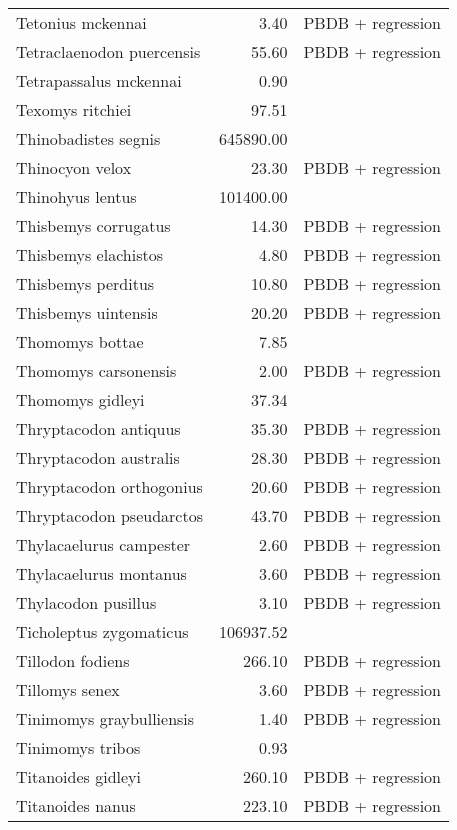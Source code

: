 \begin{table}[ht]
\begin{tabular}{lrl}
  Tetonius mckennai & 3.40 & PBDB + regression \\ 
  Tetraclaenodon puercensis & 55.60 & PBDB + regression \\ 
  Tetrapassalus mckennai & 0.90 & \cite{Brown1980} \\ 
  Texomys ritchiei & 97.51 & \cite{Tomiya2013} \\ 
  Thinobadistes segnis & 645890.00 & \cite{McDonald1995} \\ 
  Thinocyon velox & 23.30 & PBDB + regression \\ 
  Thinohyus lentus & 101400.00 & \cite{McKenna2011} \\ 
  Thisbemys corrugatus & 14.30 & PBDB + regression \\ 
  Thisbemys elachistos & 4.80 & PBDB + regression \\ 
  Thisbemys perditus & 10.80 & PBDB + regression \\ 
  Thisbemys uintensis & 20.20 & PBDB + regression \\ 
  Thomomys bottae & 7.85 & \cite{Smith2004} \\ 
  Thomomys carsonensis & 2.00 & PBDB + regression \\ 
  Thomomys gidleyi & 37.34 & \cite{Tomiya2013} \\ 
  Thryptacodon antiquus & 35.30 & PBDB + regression \\ 
  Thryptacodon australis & 28.30 & PBDB + regression \\ 
  Thryptacodon orthogonius & 20.60 & PBDB + regression \\ 
  Thryptacodon pseudarctos & 43.70 & PBDB + regression \\ 
  Thylacaelurus campester & 2.60 & PBDB + regression \\ 
  Thylacaelurus montanus & 3.60 & PBDB + regression \\ 
  Thylacodon pusillus & 3.10 & PBDB + regression \\ 
  Ticholeptus zygomaticus & 106937.52 & \cite{Tomiya2013} \\ 
  Tillodon fodiens & 266.10 & PBDB + regression \\ 
  Tillomys senex & 3.60 & PBDB + regression \\ 
  Tinimomys graybulliensis & 1.40 & PBDB + regression \\ 
  Tinimomys tribos & 0.93 & \cite{Skinner1972} \\ 
  Titanoides gidleyi & 260.10 & PBDB + regression \\ 
  Titanoides nanus & 223.10 & PBDB + regression \\ 

\end{tabular}
\end{table}
